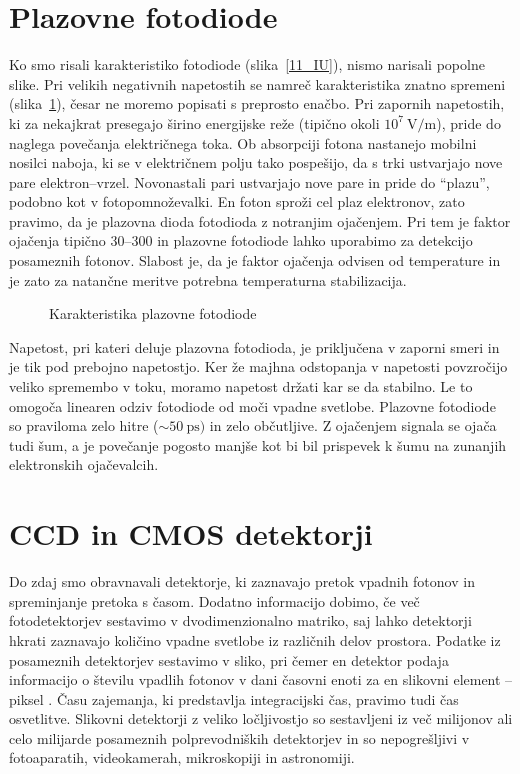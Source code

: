 \section{Plazovne fotodiode}
Ko smo risali karakteristiko fotodiode (slika~\ref{11_IU}), nismo narisali popolne slike.
Pri velikih negativnih napetostih se namreč karakteristika znatno spremeni (slika~\ref{11_plaz}), 
česar ne moremo popisati s preprosto enačbo. Pri zapornih napetostih, ki za nekajkrat presegajo 
širino energijske reže (tipično okoli $10^7~\si{\volt}/\si{\meter}$), 
pride do naglega povečanja električnega toka. Ob absorpciji fotona nastanejo mobilni nosilci naboja, ki 
se v električnem polju tako pospešijo, da s trki ustvarjajo nove pare 
elektron--vrzel. Novonastali pari  ustvarjajo nove pare in pride do ``plazu'', podobno kot v 
fotopomnoževalki. En foton  sproži cel plaz elektronov, zato pravimo, da je plazovna dioda
fotodioda z notranjim ojačenjem. Pri tem je faktor ojačenja tipično $30$--$300$ 
in plazovne fotodiode lahko 
uporabimo za detekcijo posameznih fotonov. Slabost je, da je faktor ojačenja odvisen od
temperature in je zato za natančne meritve potrebna temperaturna stabilizacija.
\begin{figure}[h]
\centering
\def\svgwidth{60truemm} 

\caption{Karakteristika plazovne fotodiode}
\label{11_plaz}
\end{figure}

Napetost, pri kateri deluje plazovna fotodioda, je priključena v zaporni smeri 
in je tik pod prebojno napetostjo. Ker že  majhna odstopanja v napetosti povzročijo veliko
spremembo v toku, moramo napetost držati kar se da stabilno. Le to omogoča
linearen odziv fotodiode od moči vpadne svetlobe. Plazovne fotodiode so praviloma zelo hitre 
($\sim 50~\si{\pico\second})$ in zelo občutljive. Z ojačenjem signala se ojača tudi šum, a je 
povečanje pogosto manjše kot bi bil prispevek k šumu na zunanjih elektronskih ojačevalcih. 

\section{CCD in CMOS detektorji}
Do zdaj smo obravnavali detektorje, 
ki zaznavajo pretok vpadnih fotonov in spreminjanje
pretoka s časom. Dodatno informacijo dobimo, če več fotodetektorjev sestavimo v 
dvodimenzionalno matriko, saj lahko detektorji hkrati zaznavajo količino vpadne svetlobe 
iz različnih delov prostora. Podatke iz posameznih detektorjev sestavimo v sliko, pri čemer 
en detektor podaja informacijo o številu vpadlih fotonov 
v dani časovni enoti za en slikovni element -- piksel . Času zajemanja, ki
predstavlja integracijski čas, pravimo tudi čas osvetlitve.  
Slikovni detektorji z veliko ločljivostjo so sestavljeni iz 
več milijonov ali celo milijarde posameznih polprevodniških detektorjev in so 
nepogrešljivi v fotoaparatih, videokamerah, mikroskopiji in astronomiji.


